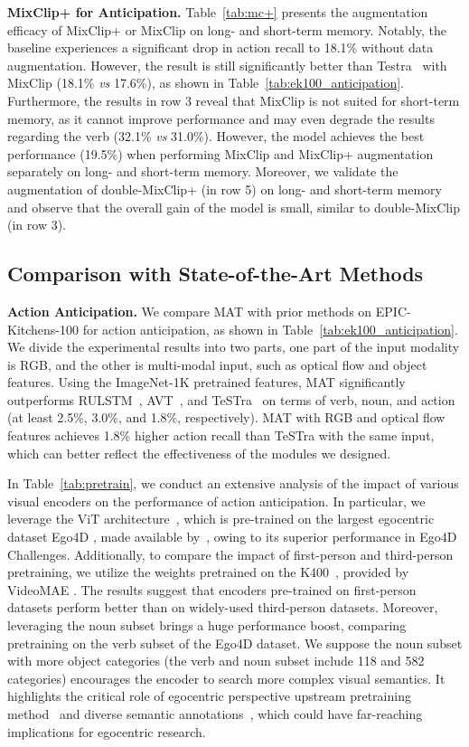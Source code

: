 \textbf{MixClip+ for Anticipation.}
Table~\ref{tab:mc+} presents the augmentation efficacy of MixClip+ or MixClip on long- and short-term memory. Notably, the baseline experiences a significant drop in action recall to 18.1\% without data augmentation. However, the result is still significantly better than Testra~\cite{testra} with MixClip (18.1\% \emph{vs} 17.6\%), as shown in Table~\ref{tab:ek100_anticipation}.
Furthermore, the results in row 3 reveal that MixClip is not suited for short-term memory, as it cannot improve performance and may even degrade the results regarding the verb (32.1\% \emph{vs} 31.0\%). However, the model achieves the best performance (19.5\%) when performing MixClip and MixClip+ augmentation separately on long- and short-term memory. Moreover, we validate the augmentation of double-MixClip+ (in row 5) on long- and short-term memory and observe that the overall gain of the model is small, similar to double-MixClip (in row 3).



\subsection{Comparison with State-of-the-Art Methods}


\textbf{Action Anticipation.}
We compare MAT with prior methods on EPIC-Kitchens-100 for action anticipation, as shown in Table~\ref{tab:ek100_anticipation}. We divide the experimental results into two parts, one part of the input modality is RGB, and the other is multi-modal input, such as optical flow and object features.
Using the ImageNet-1K pretrained features, MAT significantly outperforms RULSTM~\cite{rulstm}, AVT~\cite{avt}, and TeSTra~\cite{testra} on terms of verb, noun, and action (at least 2.5\%,  3.0\%, and 1.8\%, respectively). MAT with RGB and optical flow features achieves 1.8\% higher action recall than TeSTra with the same input, which can better reflect the effectiveness of the modules we designed.



In Table~\ref{tab:pretrain}, we conduct an extensive analysis of the impact of various visual encoders on the performance of action anticipation. In particular, we leverage the ViT architecture~\cite{vit}, which is pre-trained on the largest egocentric dataset Ego4D \cite{ego4d}, made available by~\cite{internvideo}, owing to its superior performance in Ego4D Challenges. Additionally, to compare the impact of first-person and third-person pretraining, we utilize the weights pretrained on the K400~\cite{kinetics}, provided by VideoMAE \cite{videomae}. 
The results suggest that encoders pre-trained on first-person datasets perform better than on widely-used third-person datasets. Moreover, leveraging the noun subset brings a huge performance boost, comparing pretraining on the verb subset of the Ego4D dataset. We suppose the noun subset with more object categories (the verb and noun subset include 118 and 582 categories) encourages the encoder to search more complex visual semantics.
It highlights the critical role of egocentric perspective upstream pretraining method~\cite{egovlp, lavila} and diverse semantic annotations~\cite{ego4d, ek100, egotaskqa}, which could have far-reaching implications for egocentric research.


